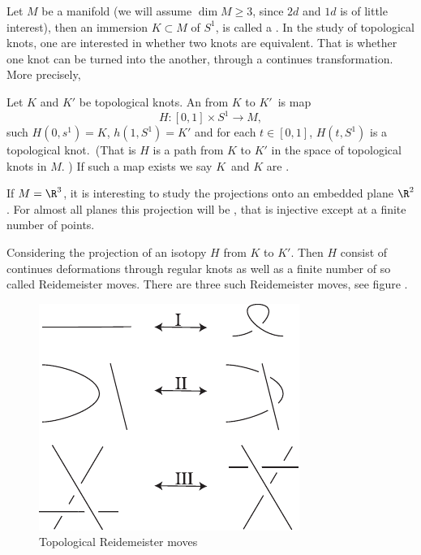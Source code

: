 

Let $M$ be a manifold (we will assume $\dim M \ge 3$, since $2d$ and $1d$ is of
little interest), then an immersion $K \subset M$ of $S^1$, is called a
.  
In the study of topological knots, one are interested in whether two knots are
equivalent. That is whether one knot can be turned into the another,
through a continues transformation. More precisely, 

\begin{defn}
Let $K$ and $K'$ be topological knots. An  from $K$ to $K'$ is
map
\[ H : [0,1] \times S^1 \to M, \]
such $H(0,s^1) = K$, $h(1,S^1) = K'$ and for each $t\in [0,1]$, $H(t, S^1)$ is a
topological knot. (That is $H$ is a path from $K$ to $K'$ in the space of
topological knots in $M$. ) If such a map exists we say $K$ and $K$ are
.
\end{defn}

If $M = \R^3$, it is interesting to study the projections onto an embedded plane
$\R^2$. For almost all planes this projection will be , that is
injective except at a finite number of points.

\begin{lemma}
Considering the projection of an isotopy $H$ from $K$ to $K'$. Then $H$ consist
of continues deformations through regular knots as well as a finite number of so
called Reidemeister moves. There are three such Reidemeister moves, see figure
.
\end{lemma}


\begin{figure}
\centering
\includegraphics[width=.4\textwidth]{figs/reid_moves_top.pdf}
\caption{Topological Reidemeister moves}
\label{fig:reid_move_top}
\end{figure}
